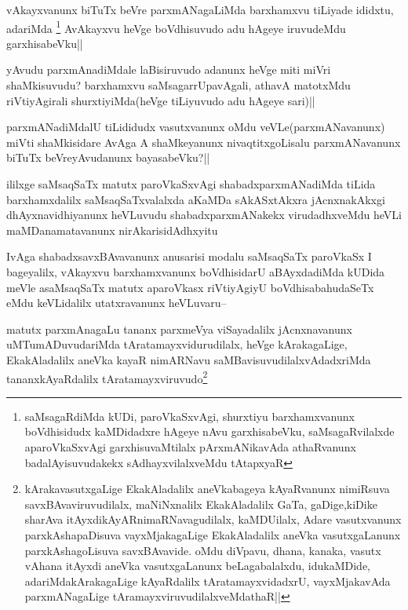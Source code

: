 \begin{artha}
vAkayxvanunx biTuTx beVre parxmANagaLiMda barxhamxvu tiLiyade ididxtu, adariMda \footnote{saMsagaRdiMda kUDi, paroVkaSxvAgi, shurxtiyu barxhamxvanunx boVdhisidudx kaMDidadxre hAgeye nAvu garxhisabeVku, saMsagaRvilalxde aparoVkaSxvAgi garxhisuvaMtilalx pArxmANikavAda athaRvanunx badalAyisuvudakekx sAdhayxvilalxveMdu tAtapxyaR} AvAkayxvu heVge boVdhisuvudo adu hAgeye iruvudeMdu garxhisabeVku||
\end{artha}


\begin{artha}
yAvudu parxmAnadiMdale laBisiruvudo adanunx heVge miti miVri shaMkisuvudu? barxhamxvu saMsagarrUpavAgali, athavA matotxMdu riVtiyAgirali shurxtiyiMda(heVge tiLiyuvudo adu hAgeye sari)||
\end{artha}

\begin{artha}
parxmANadiMdalU tiLididudx vasutxvanunx oMdu veVLe(parxmANavanunx) miVti shaMkisidare AvAga A shaMkeyanunx nivaqtitxgoLisalu parxmANavanunx biTuTx beVreyAvudanunx bayasabeVku?||
\end{artha}

\begin{artha}
ililxge saMsaqSaTx matutx paroVkaSxvAgi shabadxparxmANadiMda tiLida barxhamxdalilx saMsaqSaTxvalalxda aKaMDa sAkASxtAkxra jAcnxnakAkxgi dhAyxnavidhiyanunx heVLuvudu shabadxparxmANakekx virudadhxveMdu heVLi maMDanamatavanunx nirAkarisidAdhxyitu
\end{artha}

\begin{artha}
IvAga shabadxsavxBAvavanunx anusarisi modalu saMsaqSaTx paroVkaSx I bageyalilx, vAkayxvu barxhamxvanunx boVdhisidarU aBAyxdadiMda kUDida meVle asaMsaqSaTx matutx aparoVkasx riVtiyAgiyU boVdhisabahudaSeTx eMdu keVLidalilx utatxravanunx heVLuvaru--
\end{artha}

\begin{artha}
matutx parxmAnagaLu tananx parxmeVya viSayadalilx jAcnxnavanunx uMTumADuvudariMda tAratamayxvidurudilalx, heVge kArakagaLige, EkakAladalilx aneVka kayaR nimARNavu saMBavisuvudilalxvAdadxriMda tananxkAyaRdalilx tAratamayxviruvudo\footnote{kArakavasutxgaLige EkakAladalilx aneVkabageya kAyaRvanunx nimiRsuva savxBAvaviruvudilalx, maNiNxnalilx EkakAladalilx GaTa, gaDige,kiDike sharAva itAyxdikAyARnimaRNavagudilalx, kaMDUilalx, Adare vasutxvanunx parxkAshapaDisuva vayxMjakagaLige EkakAladalilx aneVka vasutxgaLanunx parxkAshagoLisuva savxBAvavide. oMdu diVpavu, dhana, kanaka, vasutx vAhana itAyxdi aneVka vasutxgaLanunx beLagabalalxdu, idukaMDide, adariMdakArakagaLige kAyaRdalilx tAratamayxvidadxrU, vayxMjakavAda parxmANagaLige tAramayxviruvudilalxveMdathaR||} 
\end{artha}

